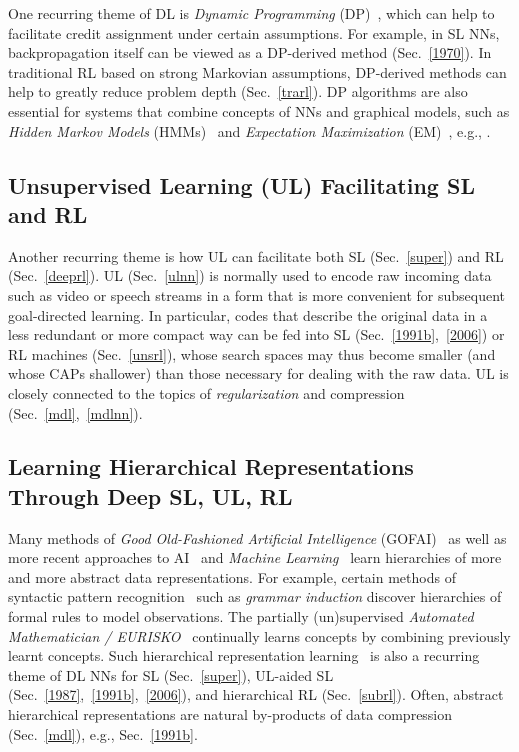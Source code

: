 \documentclass[letterpaper]{article}
\begin{document}
\begin{sloppypar}
One recurring theme of DL is
{\em Dynamic Programming} (DP)~\citep{Bellman:1957},
which  can help to facilitate credit assignment
under certain assumptions. For example, 
in SL NNs, backpropagation itself can be viewed as a DP-derived method (Sec.~\ref{1970}).
In traditional RL based on strong Markovian assumptions,
DP-derived methods can help to greatly reduce problem depth (Sec.~\ref{trarl}). 
DP algorithms are also essential for systems that combine concepts of NNs and
graphical models, such as {\em Hidden Markov
Models} (HMMs)~\citep{stratonovich1960,baum1966}
and {\em Expectation Maximization} (EM)~\citep{dempster77,friedman2001}, e.g., \citep{bottou91,bengio91,bourlard+morgan:1994,baldichauvin96,jordan2001,bishop:2006,hastie2009,domingos2011,dahl2012,speech2012,diwu2014}.



\subsection{Unsupervised Learning (UL) Facilitating SL and RL}
\label{ul}

Another recurring theme is how 
UL 
can facilitate both SL (Sec.~\ref{super}) and RL (Sec.~\ref{deeprl}).
UL (Sec.~\ref{ulnn}) is normally used to 
encode raw incoming data such as video or speech streams
in a form that is more convenient for subsequent goal-directed learning.
In particular, codes that describe the original data in a less redundant or more compact way
can be fed into SL (Sec.~\ref{1991b},~\ref{2006})
or RL machines (Sec.~\ref{unsrl}), whose
search spaces may thus become smaller 
(and whose CAPs shallower)
than those necessary for dealing with the raw data.
UL is closely 
connected to the topics of 
{\em regularization} 
and compression (Sec.~\ref{mdl},~\ref{mdlnn}).

\subsection{Learning Hierarchical Representations Through Deep SL, UL, RL}
\label{hie}

Many methods of 
{\em  Good Old-Fashioned Artificial Intelligence} (GOFAI)~\citep{Nilsson:80} 
as well as more recent approaches to AI~\citep{russell1995} and {\em Machine Learning}~\citep{Mitchell:97} 
learn hierarchies of more and more abstract data representations.
For example, certain methods of syntactic pattern recognition~\citep{Fu:77} such as
{\em grammar induction} discover hierarchies of  
formal rules to model observations.
The partially (un)supervised
{\em Automated Mathematician / EURISKO}~\citep{Lenat:83,Lenat:84} continually learns   
concepts by combining previously learnt concepts.
Such hierarchical representation learning~\citep{Ring:94,bengio2013tpami,lideng2014} is also a recurring theme of
DL NNs for SL (Sec.~\ref{super}), 
UL-aided SL (Sec.~\ref{1987},~\ref{1991b},~\ref{2006}), 
and hierarchical RL (Sec.~\ref{subrl}).
Often, abstract hierarchical representations are natural by-products of
data compression (Sec.~\ref{mdl}), e.g., Sec.~\ref{1991b}. 



\end{sloppypar}
\end{document}
